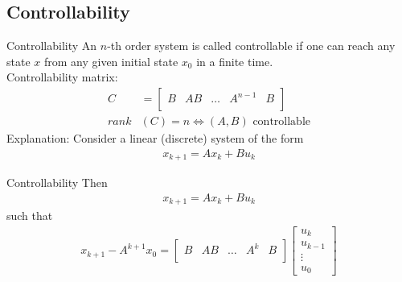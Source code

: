 \subsection{Controllability}
\begin{frame}{Controllability}
An $n$-th order system is called controllable if one can reach
any state $x$ from any given initial state $x_0$ in a finite time.\\
\vspace{0,3cm}
Controllability matrix:
\begin{align*}
C&=\begin{bmatrix}
    B&AB&\hdots&A^{n-1}&B\\
  \end{bmatrix}\\
rank&(C)=n\iff(A,B)\text{ controllable}
\end{align*}
Explanation:
Consider a linear (discrete) system of the form
\begin{align*}
x_{k+1}=Ax_k+Bu_k
\end{align*}
\end{frame}

\begin{frame}{Controllability}
Then
\begin{align*}
x_{k+1}=Ax_k+Bu_k
\end{align*}
such that
\begin{align*}
x_{k+1}-A^{k+1}x_0=
        \begin{bmatrix}
             B&AB&\hdots&A^{k}&B\\
        \end{bmatrix}
        \begin{bmatrix}
             u_k\\
             u_{k-1}\\
             \vdots\\
             u_0
        \end{bmatrix}\\
\end{align*}
\end{frame}

